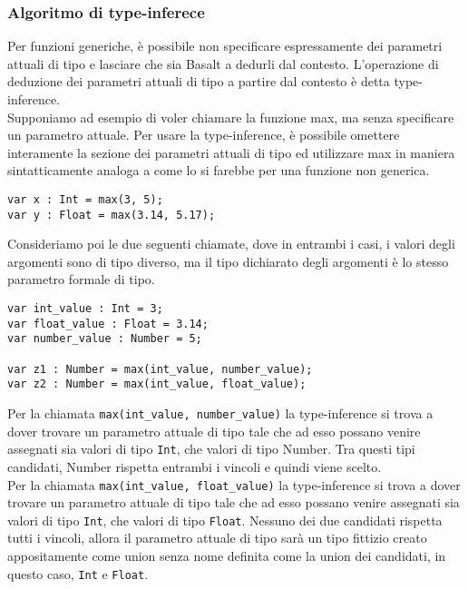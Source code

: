 \subsubsection{Algoritmo di type-inferece}
Per funzioni generiche, è possibile non specificare espressamente dei parametri 
attuali di tipo e lasciare che sia Basalt a dedurli dal contesto. 
L’operazione di deduzione dei parametri attuali di tipo a partire dal 
contesto è detta type-inference. \\

Supponiamo ad esempio di voler chiamare la funzione max, ma 
senza specificare un parametro attuale. Per usare la type-inference, 
è possibile omettere interamente la sezione dei parametri attuali di 
tipo ed utilizzare max in maniera sintatticamente analoga a come 
lo si farebbe per una funzione non generica. \\

\vspace{0.5cm}
\begin{lstlisting}[frame=single]
var x : Int = max(3, 5);
var y : Float = max(3.14, 5.17);
\end{lstlisting}
\vspace{0.5cm}

Consideriamo poi le due seguenti chiamate, dove in entrambi i casi, 
i valori degli argomenti sono di tipo diverso, ma il tipo dichiarato 
degli argomenti è lo stesso parametro formale di tipo. \\

\vspace{0.5cm}
\begin{lstlisting}[frame=single]
var int_value : Int = 3;
var float_value : Float = 3.14;
var number_value : Number = 5;

var z1 : Number = max(int_value, number_value);
var z2 : Number = max(int_value, float_value);
\end{lstlisting}
\vspace{0.5cm}
 
Per la chiamata \texttt{max(int\_value, number\_value)} la type-inference si trova a 
dover trovare un parametro attuale di tipo tale che ad esso possano 
venire assegnati sia valori di tipo \texttt{Int}, che valori di tipo Number. Tra 
questi tipi candidati, Number rispetta entrambi i vincoli e quindi viene scelto. \\

Per la chiamata \texttt{max(int\_value, float\_value)} la type-inference si trova a 
dover trovare un parametro attuale di tipo tale che ad esso 
possano venire assegnati sia valori di tipo \texttt{Int}, che valori 
di tipo \texttt{Float}. Nessuno dei due candidati rispetta tutti i vincoli, 
allora il parametro attuale di tipo sarà un tipo fittizio creato 
appositamente come union senza nome definita come la union dei candidati, 
in questo caso, \texttt{Int} e \texttt{Float}.